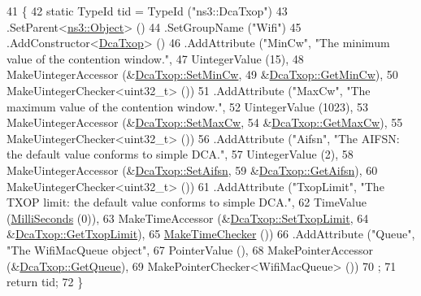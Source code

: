 \begin{DoxyCode}
41 \{
42   \textcolor{keyword}{static} TypeId tid = TypeId (\textcolor{stringliteral}{"ns3::DcaTxop"})
43     .SetParent<\hyperlink{classns3_1_1Object}{ns3::Object}> ()
44     .SetGroupName (\textcolor{stringliteral}{"Wifi"})
45     .AddConstructor<\hyperlink{classns3_1_1DcaTxop_a73861f6fb39333b1a260a3b020b01e3d}{DcaTxop}> ()
46     .AddAttribute (\textcolor{stringliteral}{"MinCw"}, \textcolor{stringliteral}{"The minimum value of the contention window."},
47                    UintegerValue (15),
48                    MakeUintegerAccessor (&\hyperlink{classns3_1_1DcaTxop_a97542c610e1f9bcf5b433dd9cdbb1660}{DcaTxop::SetMinCw},
49                                          &\hyperlink{classns3_1_1DcaTxop_aa3d8596629fbe818547830ea05d71508}{DcaTxop::GetMinCw}),
50                    MakeUintegerChecker<uint32\_t> ())
51     .AddAttribute (\textcolor{stringliteral}{"MaxCw"}, \textcolor{stringliteral}{"The maximum value of the contention window."},
52                    UintegerValue (1023),
53                    MakeUintegerAccessor (&\hyperlink{classns3_1_1DcaTxop_aa6ede533b8d2d4299930f7766c946ba3}{DcaTxop::SetMaxCw},
54                                          &\hyperlink{classns3_1_1DcaTxop_ac476cb39043eb33877fa8b9d6007db0a}{DcaTxop::GetMaxCw}),
55                    MakeUintegerChecker<uint32\_t> ())
56     .AddAttribute (\textcolor{stringliteral}{"Aifsn"}, \textcolor{stringliteral}{"The AIFSN: the default value conforms to simple DCA."},
57                    UintegerValue (2),
58                    MakeUintegerAccessor (&\hyperlink{classns3_1_1DcaTxop_a0d0de3ac05a42f7ea809d785c13ee975}{DcaTxop::SetAifsn},
59                                          &\hyperlink{classns3_1_1DcaTxop_a24cca5cd75c506940a47f8e4cf87c2c1}{DcaTxop::GetAifsn}),
60                    MakeUintegerChecker<uint32\_t> ())
61     .AddAttribute (\textcolor{stringliteral}{"TxopLimit"}, \textcolor{stringliteral}{"The TXOP limit: the default value conforms to simple DCA."},
62                    TimeValue (\hyperlink{group__timecivil_gaf26127cf4571146b83a92ee18679c7a9}{MilliSeconds} (0)),
63                    MakeTimeAccessor (&\hyperlink{classns3_1_1DcaTxop_a0f4815d1c66ef7abb71d08b58dcf5787}{DcaTxop::SetTxopLimit},
64                                      &\hyperlink{classns3_1_1DcaTxop_a0ccd95b29f66c25d0c1baf5437f90fcf}{DcaTxop::GetTxopLimit}),
65                    \hyperlink{group__time_ga7032965bd4afa578691d88c09e4481c1}{MakeTimeChecker} ())
66     .AddAttribute (\textcolor{stringliteral}{"Queue"}, \textcolor{stringliteral}{"The WifiMacQueue object"},
67                    PointerValue (),
68                    MakePointerAccessor (&\hyperlink{classns3_1_1DcaTxop_a6c89d0aeccbc5e8724d404bc45f796d7}{DcaTxop::GetQueue}),
69                    MakePointerChecker<WifiMacQueue> ())
70   ;
71   \textcolor{keywordflow}{return} tid;
72 \}
\end{DoxyCode}


